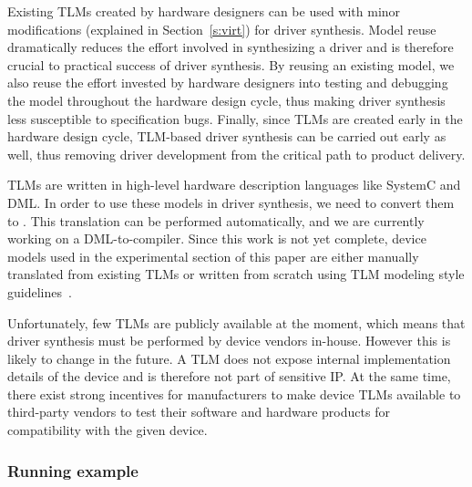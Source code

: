 Existing TLMs created by hardware designers can be used with minor modifications (explained in Section~\ref{s:virt}) for driver synthesis.  Model reuse dramatically reduces the effort involved in synthesizing a driver and is therefore crucial to practical success of driver synthesis.  By reusing an existing model, we also reuse the effort invested by hardware designers into testing and debugging the model throughout the hardware design cycle, thus making driver synthesis less susceptible to specification bugs.  Finally, since TLMs are created early in the hardware design cycle, TLM-based driver synthesis can be carried out early as well, thus removing driver development from the critical path to product delivery.

TLMs are written in high-level hardware description languages like SystemC and DML.  In order to use these models in driver synthesis, we need to convert them to \tsl.  This translation can be performed automatically, and we are currently working on a DML-to-\tsl compiler.  Since this work is not yet complete, device models used in the experimental section of this paper are either manually translated from existing TLMs or written from scratch using TLM modeling style guidelines~\cite{dml_ug}.

Unfortunately, few TLMs are publicly available at the moment, which means that driver synthesis must be performed by  device vendors in-house.  However this is likely to change in the future.  A TLM does not expose internal implementation details of the device and is therefore not part of sensitive IP.  At the same time, there exist strong incentives for manufacturers to make device TLMs available to third-party vendors to test their software and hardware products for compatibility with the given device.

\subsubsection{Running example}

